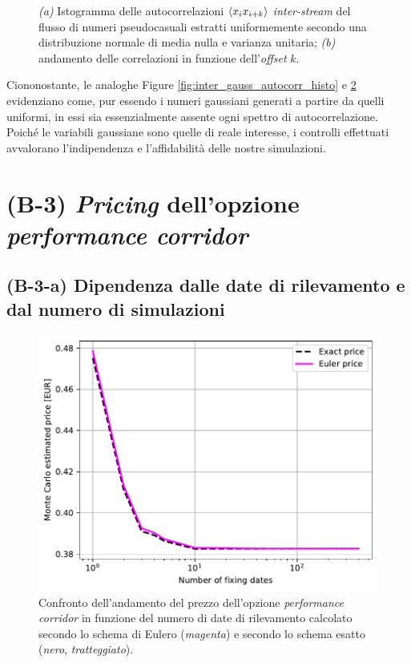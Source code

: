 \begin{figure}[t]
\begin{subfigure}{.5\textwidth}
  \caption{}
  \label{fig:inter_gauss_autocorr_offset}
\end{subfigure}
\caption{\textit{(a)} Istogramma delle autocorrelazioni $\braket{x_i x_{i+k}}$ \textit{inter-stream} del flusso di numeri pseudocasuali estratti uniformemente secondo una distribuzione normale di media nulla e varianza unitaria; \textit{(b)} andamento delle correlazioni in funzione dell'\textit{offset} $k$.}
\end{figure}

Ciononostante, le analoghe Figure \ref{fig:inter_gauss_autocorr_histo} e \ref{fig:inter_gauss_autocorr_offset} evidenziano come, pur essendo i numeri gaussiani generati a partire da quelli uniformi, in essi sia essenzialmente assente ogni spettro di autocorrelazione. Poiché le variabili gaussiane sono quelle di reale interesse, i controlli effettuati avvalorano l'indipendenza e l'affidabilità delle nostre simulazioni.

\section{(B-3) \textit{Pricing} dell'opzione \textit{performance corridor}}
\subsection{(B-3-a) Dipendenza dalle date di rilevamento e dal numero di simulazioni}

\begin{figure}[t]
    \centering
    \includegraphics[scale=0.5]{graphs/OptionPriceVsM_PriceVsM_N100mln.pdf}
    \caption{Confronto dell'andamento del prezzo dell'opzione \textit{performance corridor} in funzione del numero di date di rilevamento calcolato secondo lo schema di Eulero (\textit{magenta}) e secondo lo schema esatto (\textit{nero}, \textit{tratteggiato}).}
    \label{fig:exactvseuler_M}
\end{figure}

